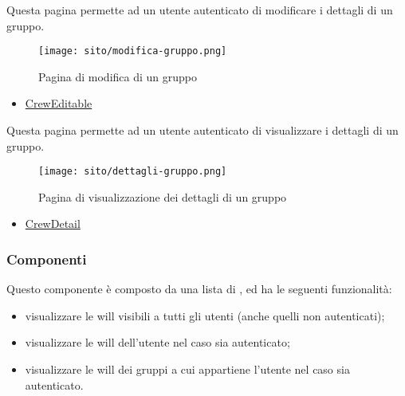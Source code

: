 Questa pagina permette ad un utente autenticato di modificare i dettagli di un gruppo. 
\begin{figure}[H] 
    \centerline{\texttt{[image: sito/modifica-gruppo.png]}} 
    \caption{Pagina di modifica di un gruppo}
\end{figure}
\begin{itemize}
    \item \hyperref[par:CrewEditable]{CrewEditable}
\end{itemize}

Questa pagina permette ad un utente autenticato di visualizzare i dettagli di un gruppo. 
\begin{figure}[H] 
    \centerline{\texttt{[image: sito/dettagli-gruppo.png]}} 
    \caption{Pagina di visualizzazione dei dettagli di un gruppo}
\end{figure}
\begin{itemize}
    \item \hyperref[par:CrewDetail]{CrewDetail}
\end{itemize}

\subsubsection{Componenti}
\label{par:HomepageComponent}
Questo componente è composto da una lista di , ed ha le seguenti funzionalità: 
\begin{itemize}
    \item visualizzare le \gls{will} visibili a tutti gli utenti (anche quelli non autenticati);
    \item visualizzare le \gls{will} dell'utente nel caso sia autenticato;
    \item visualizzare le \gls{will} dei gruppi a cui appartiene l'utente nel caso sia autenticato.
\end{itemize}

